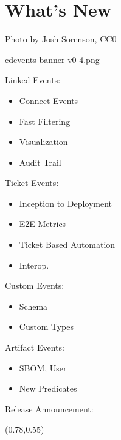 \documentclass[aspectratio=169,11pt,hyperref={colorlinks=true}]{beamer}
\begin{document}
\section{What's New}
\begin{sectionwithpiclargecentral}{Photo by \href{https://unsplash.com/@joshsorenson}{\underline{Josh Sorenson}}, CC0}
\end{sectionwithpiclargecentral}

\begin{tpicstripedframe}%
  {cdevents-banner-v0-4.png}
  {%
  Linked Events:
  \vspace{0.01\textheight}
  \begin{itemize}
    \item Connect Events
    \item Fast Filtering
    \item Visualization
    \item Audit Trail
  \end{itemize}
  }%
  {%
  Ticket Events:
  \vspace{0.01\textheight}
  \begin{itemize}
    \item Inception to Deployment
    \item E2E Metrics
    \item Ticket Based Automation
    \item Interop.
  \end{itemize}
  }%
  {%
  Custom Events:
  \vspace{0.01\textheight}
  \begin{itemize}
    \item Schema
    \item Custom Types
  \end{itemize}
  \vspace{0.03\textheight}
  Artifact Events:
  \vspace{0.01\textheight}
  \begin{itemize}
    \item SBOM, User
    \item New Predicates
  \end{itemize}
  }%
  {%
  Release Announcement:
  \begin{textblock*}{0.17\paperwidth}(0.78\paperwidth,0.55\paperheight)

\end{textblock*}}
\end{tpicstripedframe}
\end{document}
